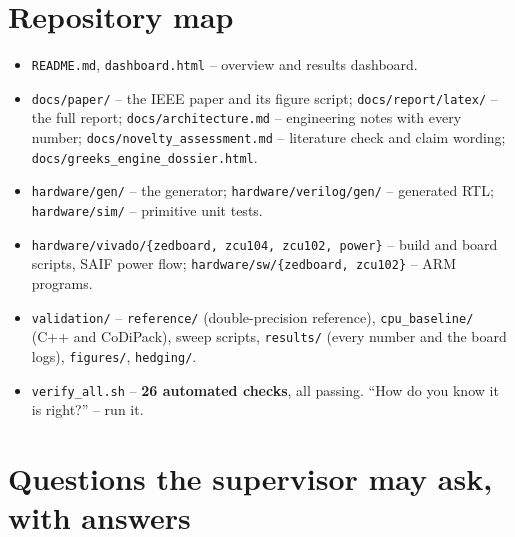 \documentclass[11pt,a4paper]{article}
\begin{document}
\section{Repository map}
\begin{itemize}
\item \texttt{README.md}, \texttt{dashboard.html} -- overview and results dashboard.
\item \texttt{docs/paper/} -- the IEEE paper and its figure script; \texttt{docs/report/latex/} -- the full report; \texttt{docs/architecture.md} -- engineering notes with every number; \texttt{docs/novelty\_assessment.md} -- literature check and claim wording; \texttt{docs/greeks\_engine\_dossier.html}.
\item \texttt{hardware/gen/} -- the generator; \texttt{hardware/verilog/gen/} -- generated RTL; \texttt{hardware/sim/} -- primitive unit tests.
\item \texttt{hardware/vivado/\{zedboard, zcu104, zcu102, power\}} -- build and board scripts, SAIF power flow; \texttt{hardware/sw/\{zedboard, zcu102\}} -- ARM programs.
\item \texttt{validation/} -- \texttt{reference/} (double-precision reference), \texttt{cpu\_baseline/} (C++ and CoDiPack), sweep scripts, \texttt{results/} (every number and the board logs), \texttt{figures/}, \texttt{hedging/}.
\item \texttt{verify\_all.sh} -- \textbf{26 automated checks}, all passing. ``How do you know it is right?'' -- run it.
\end{itemize}

\section{Questions the supervisor may ask, with answers}
\end{document}
